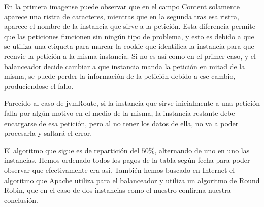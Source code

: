 \documentclass[a4paper, 12pt, spanish]{memoria}
\begin{document}
\portada\indice












En la primera imagense puede observar que en el campo Content solamente aparece una ristra de caracteres, mientras que en la segunda tras esa ristra, aparece el nombre de la instancia que sirve a la petición. Esta diferencia permite que las peticiones funcionen sin ningún tipo de problema, y esto es debido a que se utiliza una etiqueta para marcar la cookie que identifica la instancia para que reenvie la petición a la misma instancia. Si no es así como en el primer caso, y el balanceador decide cambiar a que instancia manda la petición en mitad de la misma, se puede perder la información de la petición debido a ese cambio, produciendose el fallo.










Parecido al caso de jvmRoute, si la instancia que sirve inicialmente a una petición falla por algún motivo en el medio de la misma, la instancia restante debe encargarse de esa petición, pero al no tener los datos de ella, no va a poder procesarla y saltará el error.



El algoritmo que sigue es de repartición del $50\%$, alternando de uno en uno las instancias. Hemos ordenado todos los pagos de la tabla según fecha para poder observar que efectivamente era así. También hemos buscado en Internet el algoritmo que Apache utiliza para el balanceador y utiliza un algoritmo de Round Robin, que en el caso de dos instancias como el nuestro confirma nuestra conclusión.
\end{document}

